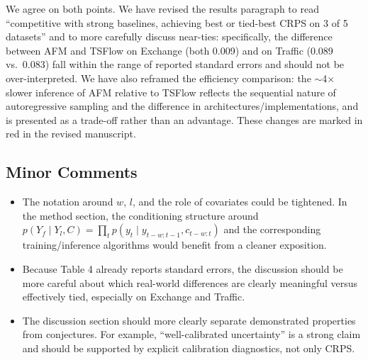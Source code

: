 \documentclass[11pt]{article}
\newcommand{\reviewertext}[1]{%
  \begin{reviewerquote}
    {\color{reviewercolor}\itshape #1}
  \end{reviewerquote}%
}
\newcommand{\authorresponse}[1]{%
    #1\par\medskip
}
\begin{document}
\authorresponse{%
We agree on both points. We have revised the results paragraph to read ``competitive with strong baselines, achieving best or tied-best CRPS on 3 of 5 datasets'' and to more carefully discuss near-ties: specifically, the difference between AFM and TSFlow on Exchange (both 0.009) and on Traffic (0.089 vs.\ 0.083) fall within the range of reported standard errors and should not be over-interpreted. We have also reframed the efficiency comparison: the $\sim$4$\times$ slower inference of AFM relative to TSFlow reflects the sequential nature of autoregressive sampling and the difference in architectures/implementations, and is presented as a trade-off rather than an advantage. These changes are marked in red in the revised manuscript.
}

\subsection{Minor Comments}

\reviewertext{%
\begin{itemize}[nosep]
  \item The notation around $w$, $l$, and the role of covariates could be tightened. In the method section, the conditioning structure around $p(Y_f \mid Y_l, C) = \prod_t p(y_t \mid y_{t-w:t-1}, c_{t-w:t})$ and the corresponding training/inference algorithms would benefit from a cleaner exposition.
  \item Because Table 4 already reports standard errors, the discussion should be more careful about which real-world differences are clearly meaningful versus effectively tied, especially on Exchange and Traffic.
  \item The discussion section should more clearly separate demonstrated properties from conjectures. For example, ``well-calibrated uncertainty'' is a strong claim and should be supported by explicit calibration diagnostics, not only CRPS.
\end{itemize}
}
\end{document}
